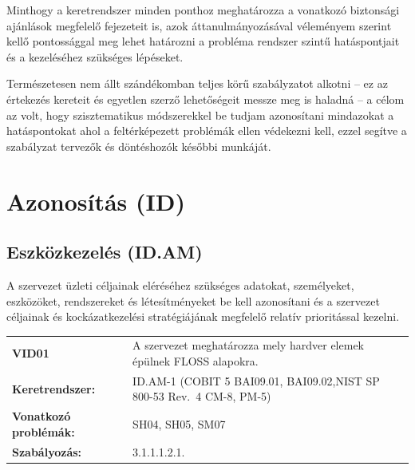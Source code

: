 \documentclass[12pt,magyar,a4paper,oneside]{scrreprt}
\begin{document}
Minthogy a keretrendszer minden ponthoz meghatározza a vonatkozó
biztonsági ajánlások megfelelő fejezeteit is, azok áttanulmányozásával
véleményem szerint kellő pontossággal meg lehet határozni a probléma
rendszer szintű hatáspontjait és a kezeléséhez szükséges lépéseket.

Természetesen nem állt szándékomban teljes körű szabályzatot alkotni --
ez az értekezés kereteit és egyetlen szerző lehetőségeit messze meg is
haladná -- a célom az volt, hogy szisztematikus módszerekkel be tudjam
azonosítani mindazokat a hatáspontokat ahol a feltérképezett problémák
ellen védekezni kell, ezzel segítve a szabályzat tervezők és döntéshozók
későbbi munkáját.

\hypertarget{azonosuxedtuxe1s-id}{%
\section{Azonosítás (ID)}\label{azonosuxedtuxe1s-id}}

\hypertarget{eszkuxf6zkezeluxe9s-id.am}{%
\subsection{Eszközkezelés (ID.AM)}\label{eszkuxf6zkezeluxe9s-id.am}}

A szervezet üzleti céljainak eléréséhez szükséges adatokat, személyeket,
eszközöket, rendszereket és létesítményeket be kell azonosítani és a
szervezet céljainak és kockázatkezelési stratégiájának megfelelő relatív
prioritással kezelni.

\begin{longtable}[]{@{}ll@{}}
\toprule
\endhead
\begin{minipage}[t]{0.16\columnwidth}\raggedright
\textbf{VID01}\strut
\end{minipage} & \begin{minipage}[t]{0.79\columnwidth}\raggedright
A szervezet meghatározza mely hardver elemek épülnek FLOSS
alapokra.\strut
\end{minipage}\tabularnewline
\begin{minipage}[t]{0.16\columnwidth}\raggedright
\textbf{Keretrendszer:}\strut
\end{minipage} & \begin{minipage}[t]{0.79\columnwidth}\raggedright
ID.AM-1 (COBIT 5 BAI09.01, BAI09.02,NIST SP 800-53 Rev.~4 CM-8,
PM-5)\strut
\end{minipage}\tabularnewline
\begin{minipage}[t]{0.16\columnwidth}\raggedright
\textbf{Vonatkozó problémák:}\strut
\end{minipage} & \begin{minipage}[t]{0.79\columnwidth}\raggedright
SH04, SH05, SM07\strut
\end{minipage}\tabularnewline
\begin{minipage}[t]{0.16\columnwidth}\raggedright
\textbf{Szabályozás:}\strut
\end{minipage} & \begin{minipage}[t]{0.79\columnwidth}\raggedright
3.1.1.1.2.1.\strut
\end{minipage}\tabularnewline
\bottomrule
\end{longtable}
\end{document}
